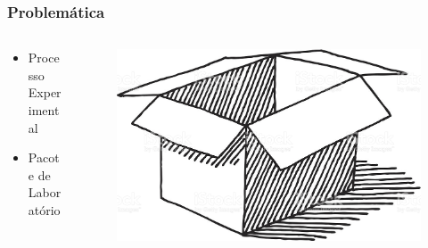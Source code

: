 \documentclass[aspectratio=169]{beamer}
\begin{document}
\begin{frame}
\frametitle{Problemática}
\justifying

\begin{columns}

\begin{column}{0.5\textwidth}
\begin{itemize}
\item Processo Experimental
\item Pacote de Laboratório
\end{itemize}
\end{column}

\begin{column}{0.5\textwidth}
\begin{figure}
\centering
\includegraphics[scale=0.2]{images/box.jpg}
\end{figure}
\end{column}
\end{columns}

\end{frame}
\end{document}
